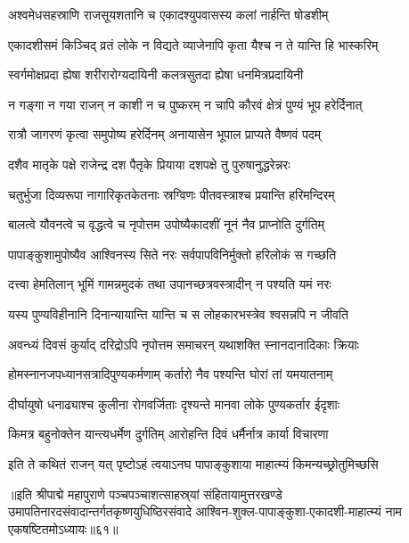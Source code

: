 \twolineshloka
{अश्वमेधसहस्राणि राजसूयशतानि च}
{एकादश्युपवासस्य कलां नार्हन्ति षोडशीम्}%

\twolineshloka
{एकादशीसमं किञ्चिद् व्रतं लोके न विद्यते}
{व्याजेनापि कृता यैश्च न ते यान्ति हि भास्करिम्}%

\twolineshloka
{स्वर्गमोक्षप्रदा ह्येषा शरीरारोग्यदायिनी}
{कलत्रसुतदा ह्येषा धनमित्रप्रदायिनी}%

\twolineshloka
{न गङ्गा न गया राजन् न काशी न च पुष्करम्}
{न चापि कौरवं क्षेत्रं पुण्यं भूप हरेर्दिनात्}%

\twolineshloka
{रात्रौ जागरणं कृत्वा समुपोष्य हरेर्दिनम्}
{अनायासेन भूपाल प्राप्यते वैष्णवं पदम्}%

\twolineshloka
{दशैव मातृके पक्षे राजेन्द्र दश पैतृके}
{प्रियाया दशपक्षे तु पुरुषानुद्धरेन्नरः}%

\twolineshloka
{चतुर्भुजा दिव्यरूपा नागारिकृतकेतनाः}
{स्रग्विणः पीतवस्त्राश्च प्रयान्ति हरिमन्दिरम्}%

\twolineshloka
{बालत्वे यौवनत्वे च वृद्धत्वे च नृपोत्तम}
{उपोष्यैकादशीं नूनं नैव प्राप्नोति दुर्गतिम्}%

\twolineshloka
{पापाङ्कुशामुपोष्यैव आश्विनस्य सिते नरः}
{सर्वपापविनिर्मुक्तो हरिलोकं स गच्छति}%

\twolineshloka
{दत्त्वा हेमतिलान् भूमिं गामन्नमुदकं तथा}
{उपानच्छत्रवस्त्रादीन् न पश्यति यमं नरः}%

\twolineshloka
{यस्य पुण्यविहीनानि दिनान्यायान्ति यान्ति च}
{स लोहकारभस्त्रेव श्वसन्नपि न जीवति}%

\twolineshloka
{अवन्ध्यं दिवसं कुर्याद् दरिद्रोऽपि नृपोत्तम}
{समाचरन् यथाशक्ति स्नानदानादिकाः क्रियाः}%

\twolineshloka
{होमस्नानजपध्यानसत्रादिपुण्यकर्मणाम्}
{कर्तारो नैव पश्यन्ति घोरां तां यमयातनाम्}%

\twolineshloka
{दीर्घायुषो धनाढ्याश्च कुलीना रोगवर्जिताः}
{दृश्यन्ते मानवा लोके पुण्यकर्तार ईदृशाः}%

\twolineshloka
{किमत्र बहुनोक्तेन यान्त्यधर्मेण दुर्गतिम्}
{आरोहन्ति दिवं धर्मैर्नात्र कार्या विचारणा}%

\twolineshloka
{इति ते कथितं राजन् यत् पृष्टोऽहं त्वयाऽनघ}
{पापाङ्कुशाया माहात्म्यं किमन्यच्छ्रोतुमिच्छसि}%

॥इति श्रीपाद्मे महापुराणे पञ्चपञ्चाशत्साहस्र्यां संहितायामुत्तरखण्डे उमापतिनारदसंवादान्तर्गतकृष्णयुधिष्ठिरसंवादे आश्विन-शुक्ल-पापाङ्कुशा-एकादशी-माहात्म्यं नाम एकषष्टितमोऽध्यायः॥६१॥

\genMangalaShloka

